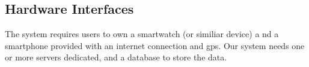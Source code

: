 \subsection{Hardware Interfaces}
The system requires users to own a smartwatch (or similiar device) a nd a smartphone provided with an internet connection and gps.
Our system needs one or more servers dedicated, and a database to store the data.
